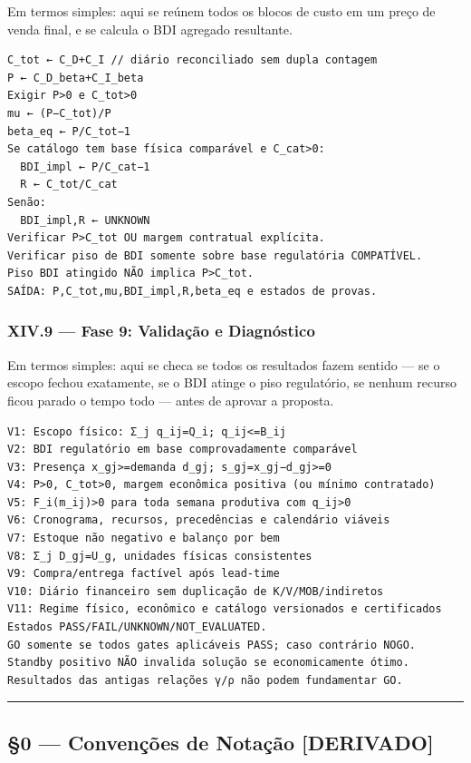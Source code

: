 \documentclass[
  10pt,
]{article}
\begin{document}
Em termos simples: aqui se reúnem todos os blocos de custo em um preço
de venda final, e se calcula o BDI agregado resultante.

\begin{verbatim}
C_tot ← C_D+C_I // diário reconciliado sem dupla contagem
P ← C_D_beta+C_I_beta
Exigir P>0 e C_tot>0
mu ← (P−C_tot)/P
beta_eq ← P/C_tot−1
Se catálogo tem base física comparável e C_cat>0:
  BDI_impl ← P/C_cat−1
  R ← C_tot/C_cat
Senão:
  BDI_impl,R ← UNKNOWN
Verificar P>C_tot OU margem contratual explícita.
Verificar piso de BDI somente sobre base regulatória COMPATÍVEL.
Piso BDI atingido NÃO implica P>C_tot.
SAÍDA: P,C_tot,mu,BDI_impl,R,beta_eq e estados de provas.
\end{verbatim}

\hypertarget{xiv.9-fase-9-validauxe7uxe3o-e-diagnuxf3stico}{%
\subsubsection{XIV.9 --- Fase 9: Validação e
Diagnóstico}\label{xiv.9-fase-9-validauxe7uxe3o-e-diagnuxf3stico}}

Em termos simples: aqui se checa se todos os resultados fazem sentido
--- se o escopo fechou exatamente, se o BDI atinge o piso regulatório,
se nenhum recurso ficou parado o tempo todo --- antes de aprovar a
proposta.

\begin{verbatim}
V1: Escopo físico: Σ_j q_ij=Q_i; q_ij<=B_ij
V2: BDI regulatório em base comprovadamente comparável
V3: Presença x_gj>=demanda d_gj; s_gj=x_gj−d_gj>=0
V4: P>0, C_tot>0, margem econômica positiva (ou mínimo contratado)
V5: F_i(m_ij)>0 para toda semana produtiva com q_ij>0
V6: Cronograma, recursos, precedências e calendário viáveis
V7: Estoque não negativo e balanço por bem
V8: Σ_j D_gj=U_g, unidades físicas consistentes
V9: Compra/entrega factível após lead-time
V10: Diário financeiro sem duplicação de K/V/MOB/indiretos
V11: Regime físico, econômico e catálogo versionados e certificados
Estados PASS/FAIL/UNKNOWN/NOT_EVALUATED.
GO somente se todos gates aplicáveis PASS; caso contrário NOGO.
Standby positivo NÃO invalida solução se economicamente ótimo.
Resultados das antigas relações γ/ρ não podem fundamentar GO.
\end{verbatim}

\begin{center}\rule{0.5\linewidth}{0.5pt}\end{center}

\hypertarget{convenuxe7uxf5es-de-notauxe7uxe3o-derivado}{%
\subsection{§0 --- Convenções de Notação
{[}DERIVADO{]}}\label{convenuxe7uxf5es-de-notauxe7uxe3o-derivado}}
\end{document}
